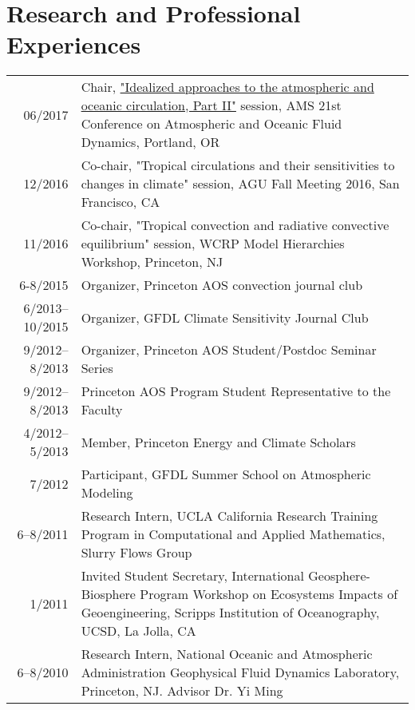 \documentclass[12pt,letterpaper]{shillcv}
\begin{document}
\section*{Research and Professional Experiences}
\label{sec:orgdf68603}
\begin{center}
\begin{tabularx}{\textwidth}{rX}
06/2017 & Chair, \href{https://ams.confex.com/ams/21Fluid19Middle/webprogram/Session43327.html}{"Idealized approaches to the atmospheric and oceanic circulation, Part II"} session, AMS 21st Conference on Atmospheric and Oceanic Fluid Dynamics, Portland, OR\\
12/2016 & Co-chair, "Tropical circulations and their sensitivities to changes in climate" session, AGU Fall Meeting 2016, San Francisco, CA\\
11/2016 & Co-chair, "Tropical convection and radiative convective equilibrium" session, WCRP Model Hierarchies Workshop, Princeton, NJ\\
6-8/2015 & Organizer, Princeton AOS convection journal club\\
6/2013–10/2015 & Organizer, GFDL Climate Sensitivity Journal Club\\
9/2012–8/2013 & Organizer, Princeton AOS Student/Postdoc Seminar Series\\
9/2012–8/2013 & Princeton AOS Program Student Representative to the Faculty\\
4/2012–5/2013 & Member, Princeton Energy and Climate Scholars\\
7/2012 & Participant, GFDL Summer School on Atmospheric Modeling\\
6–8/2011 & Research Intern, UCLA California Research Training Program in Computational and Applied Mathematics, Slurry Flows Group\\
1/2011 & Invited Student Secretary, International Geosphere-Biosphere Program Workshop on Ecosystems Impacts of Geoengineering, Scripps Institution of Oceanography, UCSD, La Jolla, CA\\
6–8/2010 & Research Intern, National Oceanic and Atmospheric Administration Geophysical Fluid Dynamics Laboratory, Princeton, NJ. Advisor Dr. Yi Ming\\
\end{tabularx}
\end{center}
\end{document}
